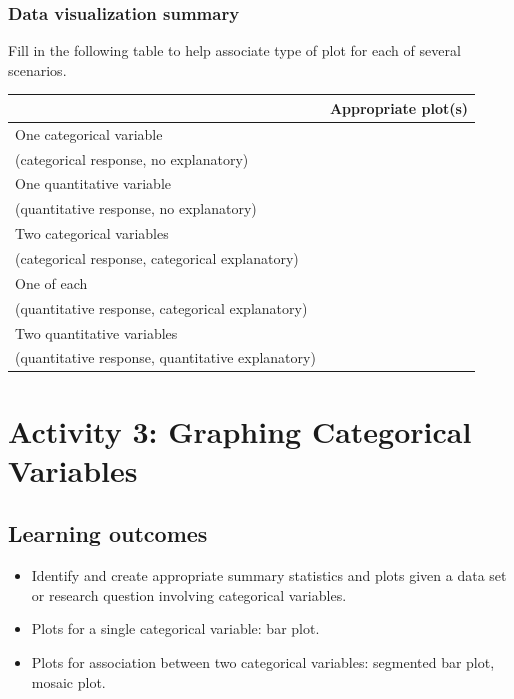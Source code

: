 \documentclass[
]{report}
\newcommand{\rgs}{\vspace{12pt}} %
\begin{document}
\hypertarget{data-visualization-summary}{%
\subsubsection*{Data visualization summary}\label{data-visualization-summary}}

Fill in the following table to help associate type of plot for each of several scenarios.

\begin{center}
\begin{tabular}{|l|p{3in}|} \hline
 & Appropriate plot(s) \\ \hline
One categorical variable & \\
(categorical response, no explanatory) & \\ \hline
One quantitative variable  & \\
(quantitative response, no explanatory) & \\ \hline
Two categorical variables  & \\
(categorical response, categorical explanatory) & \\ \hline
One of each  & \\
(quantitative response, categorical explanatory) & \\ \hline
Two quantitative variables  & \\
(quantitative response, quantitative explanatory) & \\ \hline
\end{tabular}
\end{center}

\rgs

\newpage

\hypertarget{activity-3-graphing-categorical-variables}{%
\section{Activity 3: Graphing Categorical Variables}\label{activity-3-graphing-categorical-variables}}


\hypertarget{learning-outcomes-4}{%
\subsection{Learning outcomes}\label{learning-outcomes-4}}

\begin{itemize}
\item
  Identify and create appropriate summary statistics and plots given a data set or research question involving categorical variables.
\item
  Plots for a single categorical variable: bar plot.
\item
  Plots for association between two categorical variables:
  segmented bar plot, mosaic plot.
\end{itemize}
\end{document}
